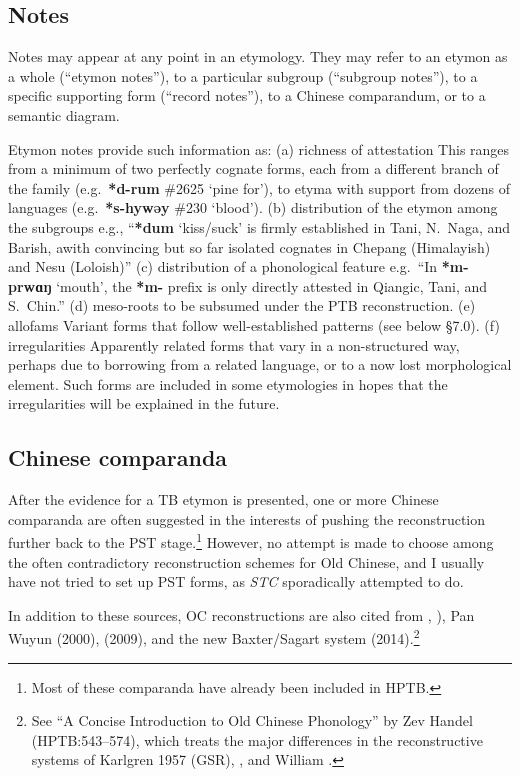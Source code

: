 \subsection{Notes}

Notes may appear at any point in an etymology. They may refer to an etymon as a whole (“etymon notes”), to a particular subgroup (“subgroup notes”), to a specific supporting form (“record notes”), to a Chinese comparandum, or to a semantic diagram.

Etymon notes provide such information as:
(a) richness of attestation
This ranges from a minimum of two perfectly cognate forms, each from a different branch of the family (e.g.\ \textbf{*d-rum} \#2625 ‘pine for’), to etyma with support from dozens of languages (e.g.\ \textbf{*s-hywǝy} \#230 ‘blood’).
(b) distribution of the etymon among the subgroups
e.g., “\textbf{*dum} ‘kiss/suck’ is firmly established in Tani, N.\ Naga, and Barish, awith convincing but so far isolated cognates in Chepang (Himalayish) and Nesu (Loloish)”
(c) distribution of a phonological feature
e.g.\ “In \textbf{*m-prwɑŋ} ‘mouth’, the \textbf{*m-} prefix is only directly attested in Qiangic, Tani, and S.\ Chin.”
(d) meso-roots to be subsumed under the PTB reconstruction.
(e) allofams 
Variant forms that follow well-established patterns (see below \S7.0).
(f) irregularities
Apparently related forms that vary in a non-structured way, perhaps due to borrowing from a related language, or to a now lost morphological element. Such forms are included in some etymologies in hopes that the irregularities will be explained in the future.

\subsection{Chinese comparanda}

After the evidence for a TB etymon is presented, one or more Chinese comparanda are often suggested in the interests of pushing the reconstruction further back to the PST stage.\footnote{Most of these comparanda have already been included in HPTB.} However, no attempt is made to choose among the often contradictory reconstruction schemes for Old Chinese, and I usually have not tried to set up PST forms, as \textit{STC} sporadically attempted to do.

In addition to these sources, OC reconstructions are also cited from \citet{GHC-OCP,GHC-RCC}, \citet{WSC-SH}), Pan Wuyun (2000), \citet{AS-ABCOC} (2009), and the new Baxter/Sagart system (2014).\footnote{See “A Concise Introduction to Old Chinese Phonology” by Zev Handel (HPTB:543–574), which treats the major differences in the reconstructive systems of Karlgren 1957 (GSR), \citet{LI1976,LI1980}, and William \citet{WHB-OC}.}


